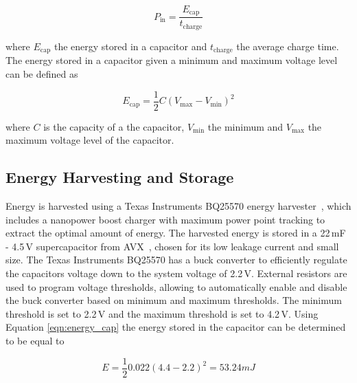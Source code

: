 \begin{equation}
	P_{\text{in}} = \frac{E_{\text{cap}}}{t_{\text{charge}}}
\end{equation}

\noindent
where $E_{\text{cap}}$ the energy stored in a capacitor and $t_{\text{charge}}$ the average charge time.
The energy stored in a capacitor given a minimum and maximum voltage level can be defined as

\begin{equation}
\label{eqn:energy_cap}
	E_{\text{cap}} = \frac{1}{2}C(V_{\max} - V_{\min})^{2}
\end{equation}

\noindent
where $C$ is the capacity of a the capacitor, $V_{\min}$ the minimum and $V_{\max}$ the maximum voltage level of the capacitor.

\subsection{Energy Harvesting and Storage}
\label{sec:pre_energy_harvesting_storage}
Energy is harvested using a Texas Instruments BQ25570 energy harvester~\cite{bq25570_2017}, which includes a nanopower boost charger with maximum power point tracking to extract the optimal amount of energy. 
The harvested energy is stored in a 22\,mF - 4.5\,V supercapacitor from AVX~\cite{avx_bestcap_2017}, chosen for its low leakage current and small size.
The Texas Instruments BQ25570 has a buck converter to efficiently regulate the capacitors voltage down to the system voltage of 2.2\,V.
External resistors are used to program voltage thresholds, allowing to automatically enable and disable the buck converter based on minimum and maximum thresholds.
The minimum threshold is set to 2.2\,V and the maximum threshold is set to 4.2\,V.
Using Equation \ref{eqn:energy_cap} the energy stored in the capacitor can be determined to be equal to

\begin{equation}
\label{eq:cap2}
E = \frac{1}{2} 0.022 (4.4 - 2.2)^2 = 53.24 mJ
\end{equation}


